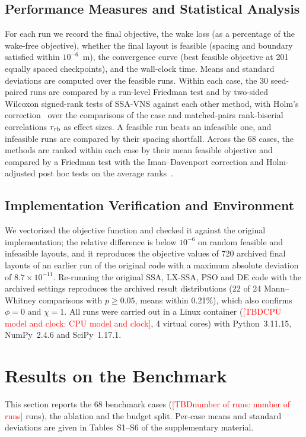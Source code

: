 \documentclass[journal,twoside]{IEEEtran}
\newcommand{\TBD}[1]{\textcolor{red}{[TBD\ifx\relax#1\relax\else: #1\fi]}}
\begin{document}
\subsection{Performance Measures and Statistical Analysis}
For each run we record the final objective, the wake loss (as a percentage of the wake-free objective), whether the final layout is feasible (spacing and boundary satisfied within $10^{-6}$~m), the convergence curve (best feasible objective at 201 equally spaced checkpoints), and the wall-clock time. Means and standard deviations are computed over the feasible runs. Within each case, the 30 seed-paired runs are compared by a run-level Friedman test and by two-sided Wilcoxon signed-rank tests of SSA-VNS against each other method, with Holm's correction~\cite{Holm1979} over the comparisons of the case and matched-pairs rank-biserial correlations $r_{\rm rb}$ as effect sizes. A feasible run beats an infeasible one, and infeasible runs are compared by their spacing shortfall. Across the 68 cases, the methods are ranked within each case by their mean feasible objective and compared by a Friedman test with the Iman--Davenport correction and Holm-adjusted post hoc tests on the average ranks~\cite{Demsar2006}.

\subsection{Implementation Verification and Environment}
\label{sec:validation}
We vectorized the objective function and checked it against the original implementation; the relative difference is below $10^{-6}$ on random feasible and infeasible layouts, and it reproduces the objective values of 720 archived final layouts of an earlier run of the original code with a maximum absolute deviation of $8.7\times10^{-11}$. Re-running the original SSA, LX-SSA, PSO and DE code with the archived settings reproduces the archived result distributions (22 of 24 Mann--Whitney comparisons with $p\ge0.05$, means within 0.21\%), which also confirms $\phi=0$ and $\chi=1$. All runs were carried out in a Linux container (\TBD{CPU model and clock}, 4 virtual cores) with Python~3.11.15, NumPy~2.4.6 and SciPy~1.17.1.

\section{Results on the Benchmark}
\label{sec:results}
This section reports the 68 benchmark cases (\TBD{number of runs} runs), the ablation and the budget split. Per-case means and standard deviations are given in Tables~S1--S6 of the supplementary material.
\end{document}
